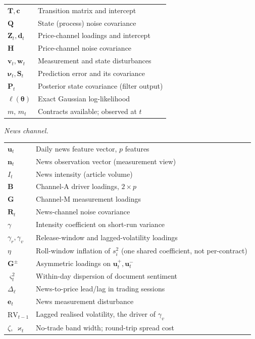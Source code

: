 \documentclass[journal]{IEEEtran}
\begin{document}
\smallskip
\begin{tabular}{@{}p{2.0cm}@{}p{5.95cm}@{}}
$\bm{T},\bm{c}$    & Transition matrix and intercept \\
$\bm{Q}$           & State (process) noise covariance \\
$\bm{Z}_t,\bm{d}_t$& Price-channel loadings and intercept \\
$\bm{H}$           & Price-channel noise covariance \\
$\bm{v}_t,\bm{w}_t$& Measurement and state disturbances \\
$\bm{\nu}_t,\bm{S}_t$ & Prediction error and its covariance \\
$\bm{P}_t$         & Posterior state covariance (filter output) \\
$\ell(\bm{\theta})$& Exact Gaussian log-likelihood \\
$m,\,m_t$          & Contracts available; observed at $t$ \\
\end{tabular}

\smallskip
\noindent\textit{News channel.}

\smallskip
\begin{tabular}{@{}p{2.0cm}@{}p{5.95cm}@{}}
$\bm{u}_t$         & Daily news feature vector, $p$ features \\
$\bm{n}_t$         & News observation vector (measurement view) \\
$I_t$              & News intensity (article volume) \\
$\bm{B}$           & Channel-A driver loadings, $2\times p$ \\
$\bm{G}$           & Channel-M measurement loadings \\
$\bm{R}_t$         & News-channel noise covariance \\
$\gamma$           & Intensity coefficient on short-run variance \\
$\gamma_r,\gamma_v$& Release-window and lagged-volatility loadings \\
$\eta$             & Roll-window inflation of $s_i^2$ (one shared coefficient, not per-contract) \\
$\bm{G}^{\pm}$     & Asymmetric loadings on $\bm{u}^{+}_t,\bm{u}^{-}_t$ \\
$\varsigma_t^2$    & Within-day dispersion of document sentiment \\
$\Delta_\ell$      & News-to-price lead/lag in trading sessions \\
$\bm{e}_t$         & News measurement disturbance \\
$\mathrm{RV}_{t-1}$& Lagged realised volatility, the driver of $\gamma_v$ \\
$\zeta,\ \varkappa_t$ & No-trade band width; round-trip spread cost \\
\end{tabular}
\end{document}
